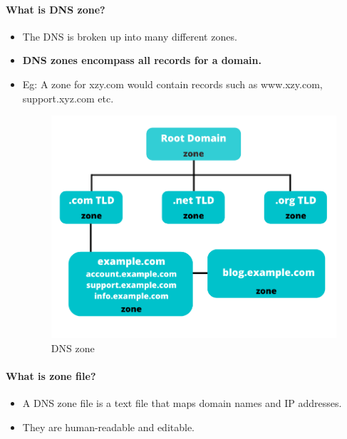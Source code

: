 \setlength{\columnsep}{3pt}
\begin{flushleft}

	\paragraph{What is DNS zone?}

	\begin{itemize}
		\item The DNS is broken up into many different zones. 
		\item \textbf{DNS zones encompass all records for a domain. }
		\item Eg: A zone for xzy.com would contain records such as www.xzy.com, support.xyz.com etc.
			\begin{figure}[h!]
			\centering
			\includegraphics[scale=.55]{content/chapter3/images/zone.png}
			\caption{DNS zone}
			\label{fig:dns_heir32}
		\end{figure}
	\end{itemize}

	\paragraph{What is zone file?}
	\begin{itemize}
		\item A DNS zone file is a text file that maps domain names and IP addresses.
		\item They are human-readable and editable. 
		
	\end{itemize}
\end{flushleft}

\newpage





